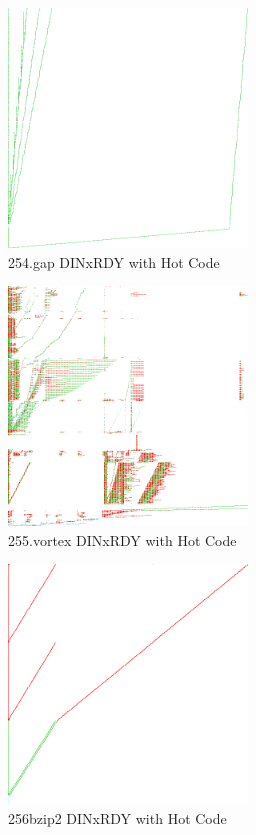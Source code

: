 \documentclass[defaultstyle,11pt]{thesis}
\begin{document}
\begin{figure}
  \centering
  \includegraphics[height=2.50in]{images/hotcode/254gapRunRef1_1000mil}
  \caption{254.gap DINxRDY with Hot Code}
  \label{fig:254gaphot}
\end{figure}

\begin{figure}
  \centering
  \includegraphics[height=2.50in]{images/hotcode/255vortexRunRef1_1000mil}
  \caption{255.vortex DINxRDY with Hot Code}
  \label{fig:255vortexhot}
\end{figure}

\begin{figure}
  \centering
  \includegraphics[height=2.50in]{images/hotcode/256bzip2RunRef1_1000mil}
  \caption{256bzip2 DINxRDY with Hot Code}
  \label{fig:256bzip2hot}
\end{figure}
\end{document}
